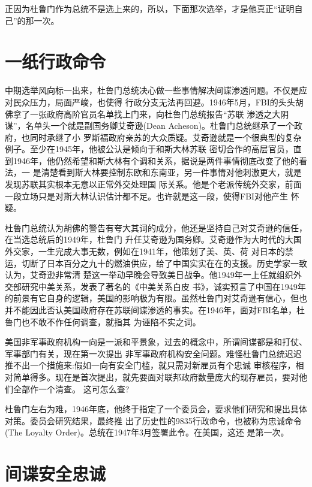 \documentclass[10pt]{article}
\begin{document}
{正因为杜鲁门作为总统不是选上来的，所以，下面那次选举，才是他真正``证明自己''的那一次。

\pagebreak
\section{一纸行政命令}

中期选举风向标一出来，杜鲁门总统决心做一些事情解决间谍渗透问题。不仅是应对民众压力，局面严峻，也使得
行政分支无法再回避。1946年5月，FBI的头头胡佛拿了一张政府高阶官员名单找上门来，向杜鲁门总统报告``苏联
渗透之大阴谋''，名单头一个就是副国务卿艾奇逊(Dean Acheson)。杜鲁门总统继承了一个政府，也同时承继了小
罗斯福政府亲苏的大众质疑。艾奇逊就是一个很典型的复杂例子。至少在1945年，他被公认是倾向于和斯大林苏联
密切合作的高层官员，直到1946年，他仍然希望和斯大林有个调和关系，据说是两件事情彻底改变了他的看法，一
是清楚看到斯大林要控制东欧和东南亚，另一件事情对他刺激更大，就是发现苏联其实根本无意以正常外交处理国
际关系。他是个老派传统外交家，前面一段立场只是对斯大林认识估计都不足。也许就是这一段，使得FBI对他产生
怀疑。

杜鲁门总统认为胡佛的警告有夸大其词的成分，他还是坚持自己对艾奇逊的信任，在当选总统后的1949年，杜鲁门
升任艾奇逊为国务卿。艾奇逊作为大时代的大国外交家，一生完成大事无数，例如在1941年，他策划了美、英、荷
对日本的禁运，切断了日本百分之九十的燃油供应，给了中国实实在在的支援。历史学家一致认为，艾奇逊非常清
楚这一举动早晚会导致美日战争。他1949年一上任就组织外交部研究中美关系，发表了著名的《中美关系白皮
书》，诚实预言了中国在1949年的前景有它自身的逻辑，美国的影响极为有限。虽然杜鲁门对艾奇逊有信心，但也
并不能因此否认美国政府存在苏联间谍渗透的事实。在1946年，面对FBI名单，杜鲁门也不敢不作任何调查，就指其
为诬陷不实之词。

美国非军事政府机构一向是一派和平景象，过去的概念中，所谓间谍都是和打仗、军事部门有关，现在第一次提出
非军事政府机构安全问题。难怪杜鲁门总统迟迟推不出一个措施来:假如一向有安全门槛，就只需对新雇员有个忠诚
审核程序，相对简单得多。现在是首次提出，就先要面对联邦政府数量庞大的现存雇员，要对他们全部作一个清查。
这可怎么查?

杜鲁门左右为难，1946年底，他终于指定了一个委员会，要求他们研究和提出具体对策。委员会研究结果，最终推
出了历史性的9835行政命令，也被称为忠诚命令(The Loyalty Order)。总统在1947年3月签署此令。在美国，这还
是第一次。


\pagebreak
\section{间谍\myrule 安全\myrule 忠诚}

}
\end{document}
